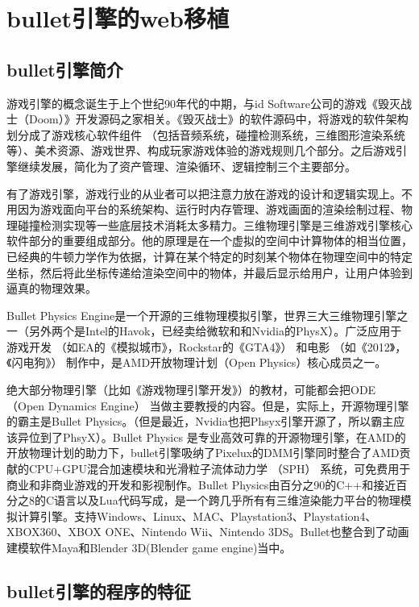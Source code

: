 \chapter{bullet引擎的web移植}

\section{bullet引擎简介}

游戏引擎的概念诞生于上个世纪90年代的中期，与id Software公司的游戏《毁灭战士（Doom）》开发源码之家相关。《毁灭战士》的软件源码中，将游戏的软件架构划分成了游戏核心软件组件 （包括音频系统，碰撞检测系统，三维图形渲染系统等）、美术资源、游戏世界、构成玩家游戏体验的游戏规则几个部分。之后游戏引擎继续发展，简化为了资产管理、渲染循环、逻辑控制三个主要部分。

有了游戏引擎，游戏行业的从业者可以把注意力放在游戏的设计和逻辑实现上。不用因为游戏面向平台的系统架构、运行时内存管理、游戏画面的渲染绘制过程、物理碰撞检测实现等一些底层技术消耗太多精力。三维物理引擎是三维游戏引擎核心软件部分的重要组成部分。他的原理是在一个虚拟的空间中计算物体的相当位置，已经典的牛顿力学作为依据，计算在某个特定的时刻某个物体在物理空间中的特定坐标，然后将此坐标传递给渲染空间中的物体，并最后显示给用户，让用户体验到逼真的物理效果。

Bullet Physics Engine是一个开源的三维物理模拟引擎，世界三大三维物理引擎之一（另外两个是Intel的Havok，已经卖给微软和和Nvidia的PhysX）。广泛应用于游戏开发 （如EA的《模拟城市》，Rockstar的《GTA4》） 和电影 （如《2012》，《闪电狗》） 制作中，是AMD开放物理计划（Open Physics）核心成员之一。

绝大部分物理引擎（比如《游戏物理引擎开发》）的教材，可能都会把ODE （Open Dynamics Engine） 当做主要教授的内容。但是，实际上，开源物理引擎的霸主是Bullet Physics。（但是最近，Nvidia也把Phsyx引擎开源了，所以霸主应该异位到了PhsyX）。Bullet Physics 是专业高效可靠的开源物理引擎，在AMD的开放物理计划的助力下，bullet引擎吸纳了Pixelux的DMM引擎同时整合了AMD贡献的CPU+GPU混合加速模块和光滑粒子流体动力学 （SPH） 系统，可免费用于商业和非商业游戏的开发和影视制作。Bullet Physics由百分之90的C++和接近百分之8的C语言以及Lua代码写成，是一个跨几乎所有有三维渲染能力平台的物理模拟计算引擎。支持Windows、Linux、MAC、Playstation3、Playstation4、XBOX360、XBOX ONE、Nintendo Wii、Nintendo 3DS。Bullet也整合到了动画建模软件Maya和Blender 3D(Blender game engine)当中。

\section{bullet引擎的程序的特征}

